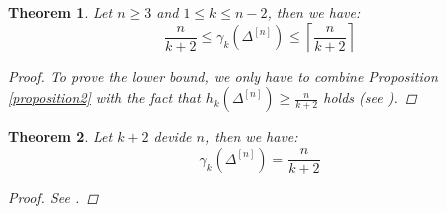 \documentclass{article}
\newtheorem{thm}{Theorem}[section]
\begin{document}
\begin{thm}\label{theorem1}
Let $n\geq 3$ and $1\leq k\leq n-2$, then we have:
\[
\frac{n}{k+2}\leq\gamma_k(\Delta^{[n]})\leq\left\lceil\frac{n}{k+2}\right\rceil
\]
\begin{proof}
To prove the lower bound, we only have to combine Proposition \ref{proposition2} with the fact that $h_k(\Delta^{[n]})\geq\frac{n}{k+2}$ holds (see \cite{2}).
\end{proof}
\end{thm}

\begin{thm}\label{theorem2}
Let $k+2$ devide $n$, then we have:
\[
\gamma_k(\Delta^{[n]})=\frac{n}{k+2}
\]
\begin{proof}
See \cite{1}.
\end{proof}
\end{thm}
\end{document}
